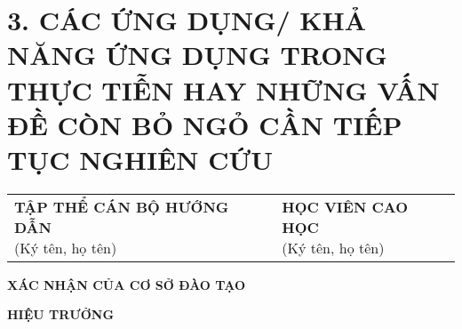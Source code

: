 \section*{3. CÁC ỨNG DỤNG/ KHẢ NĂNG ỨNG DỤNG TRONG THỰC TIỄN HAY NHỮNG VẤN ĐỀ CÒN BỎ NGỎ CẦN TIẾP TỤC NGHIÊN CỨU}
\lipsum[1-1]

\vspace{4\baselineskip}
\begin{table}[H]
\begin{adjustbox}{max width =\textwidth}
\begin{tabular}{p{8.44cm}p{8.4cm}}
\multicolumn{1}{p{8.44cm}}{
\centering \textbf{TẬP THỂ CÁN BỘ HƯỚNG DẪN} \newline
\centering
(Ký tên, họ tên) \newline
} &
\multicolumn{1}{p{8.4cm}}{
\centering \textbf{HỌC VIÊN CAO HỌC} \newline
\centering
(Ký tên, họ tên) \newline
} \\
\end{tabular}
\end{adjustbox}
\end{table}
\vspace{2\baselineskip}
\begin{center}
    \textbf{XÁC NHẬN CỦA CƠ SỞ ĐÀO TẠO}
\end{center}
\begin{center}
    \textbf{HIỆU TRƯỞNG}
\end{center}